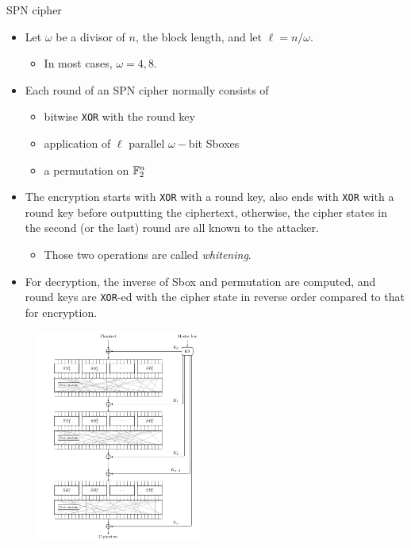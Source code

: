 \begin{frame}{SPN cipher}
    \begin{itemize}
        \item Let $\omega$ be a divisor of $n$, the block length, and let $\ell=n/\omega$.
        \begin{itemize}
            \item In most cases, $\omega=4,8$.
        \end{itemize}
       \item Each round of an SPN cipher normally consists of 
       \begin{itemize}
           \item bitwise \texttt{XOR} with the round key
           \item application of $\ell$ parallel $\omega-$bit Sboxes
           \item a permutation on ${\mathbb F}_2^n$
       \end{itemize}
       \item The encryption starts with \texttt{XOR} with a round key, also ends with \texttt{XOR} with a round key before outputting the ciphertext, otherwise, the cipher states in the second (or the last) round are all known to the attacker.
       \begin{itemize}
           \item Those two operations are called \textit{whitening}.
       \end{itemize}
       \item For decryption, the inverse of Sbox and permutation are computed, and round keys are \texttt{XOR}-ed with the cipher state in reverse order compared to that for encryption.
    \end{itemize}
\end{frame}

\begin{frame}{}
    \begin{figure}[htb]
    \centering
    \includegraphics[width=0.48\textwidth]{fig/SPN_Cipher.pdf}
\end{figure}
\end{frame}

